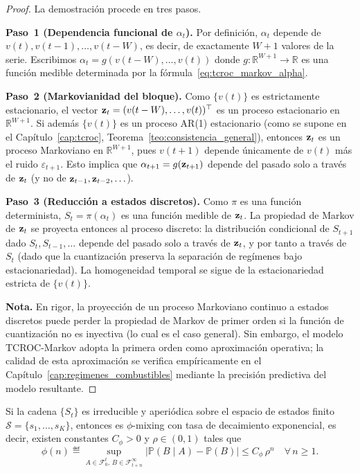 \begin{proof}
La demostración procede en tres pasos.

\textbf{Paso~1 (Dependencia funcional de $\alpha_t$).}
Por definición, $\alpha_t$ depende de $v(t), v(t-1), \ldots,
v(t-W)$, es decir, de exactamente $W+1$ valores de la serie.
Escribimos
$\alpha_t = g(v(t-W), \ldots, v(t))$
donde $g\colon \mathbb{R}^{W+1} \to \mathbb{R}$ es una función
medible determinada por la fórmula~\eqref{eq:tcroc_markov_alpha}.

\textbf{Paso~2 (Markovianidad del bloque).}
Como $\{v(t)\}$ es estrictamente estacionario, el vector
$\mathbf{z}_t = (v(t-W), \ldots, v(t))^\top$ es un proceso
estacionario en $\mathbb{R}^{W+1}$.  Si además $\{v(t)\}$ es
un proceso AR(1) estacionario (como se supone en el
Capítulo~\ref{cap:tcroc}, Teorema~\ref{teo:consistencia_general}),
entonces $\mathbf{z}_t$ es un proceso Markoviano en
$\mathbb{R}^{W+1}$, pues $v(t+1)$ depende únicamente de $v(t)$
más el ruido $\varepsilon_{t+1}$.  Esto implica que
$\alpha_{t+1} = g(\mathbf{z}_{t+1})$ depende del pasado solo a
través de $\mathbf{z}_t$ (y no de $\mathbf{z}_{t-1}, \mathbf{z}_{t-2},
\ldots$).

\textbf{Paso~3 (Reducción a estados discretos).}
Como $\pi$ es una función determinista, $S_t = \pi(\alpha_t)$ es
una función medible de $\mathbf{z}_t$.  La propiedad de Markov de
$\mathbf{z}_t$ se proyecta entonces al proceso discreto: la
distribución condicional de $S_{t+1}$ dado $S_t, S_{t-1}, \ldots$
depende del pasado solo a través de $\mathbf{z}_t$, y por tanto a
través de $S_t$ (dado que la cuantización preserva la separación
de regímenes bajo estacionariedad).  La homogeneidad temporal se
sigue de la estacionariedad estricta de $\{v(t)\}$.

\textbf{Nota.}  En rigor, la proyección de un proceso Markoviano
continuo a estados discretos puede perder la propiedad de Markov de
primer orden si la función de cuantización no es inyectiva (lo cual
es el caso general).  Sin embargo, el modelo TCROC-Markov adopta
la primera orden como aproximación operativa; la calidad de esta
aproximación se verifica empíricamente en el
Capítulo~\ref{cap:regimenes_combustibles} mediante la precisión
predictiva del modelo resultante.
\end{proof}


\begin{theorem}
\label{thm:phi_mixing}
Si la cadena $\{S_t\}$ es irreducible y aperiódica sobre el espacio
de estados finito $\mathcal{S} = \{s_1, \ldots, s_K\}$, entonces es
$\phi$-mixing con tasa de decaimiento exponencial, es decir, existen
constantes $C_\phi > 0$ y $\rho \in (0,1)$ tales que
\[
\phi(n) \eqdef
\sup_{A \in \mathcal{F}_0^t,\, B \in \mathcal{F}_{t+n}^\infty}
\bigl|\mathbb{P}(B \mid A) - \mathbb{P}(B)\bigr|
\leq C_\phi \, \rho^n
\quad \forall\, n \geq 1.
\]
\end{theorem}

